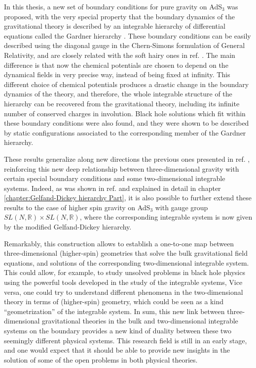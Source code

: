 \documentclass[letterpaper,11pt,oneside]{book}
\begin{document}
In this thesis, a new set of boundary conditions for pure gravity on AdS$_3$ was proposed, with the very special property that the boundary dynamics of the gravitational theory is described by an integrable hierarchy of differential equations called the Gardner hierarchy \cite{Ojeda:2019xih}. These boundary conditions can be easily described using the diagonal gauge in the Chern-Simons formulation of General Relativity, and are closely related with the soft hairy ones in ref. \cite{Afshar:2016wfy}. The main difference is that now the chemical potentials are chosen to depend on the dynamical fields in very precise way, instead of being fixed at infinity. This different choice of chemical potentials produces a  drastic change in the boundary dynamics of the theory, and therefore, the whole integrable structure of the hierarchy can be recovered from the gravitational theory, including its infinite number of conserved charges in involution. Black hole solutions which fit within these boundary conditions were also found, and they were shown to be described by static configurations associated to the corresponding member of the Gardner hierarchy.

These results generalize along new directions the previous ones presented in ref. \cite{Perez:2016vqo}, reinforcing this new deep relationship between three-dimensional gravity with certain special boundary conditions and some two-dimensional integrable systems. Indeed, as was shown in ref. \cite{Ojeda:2020bgz} and explained in detail in chapter \ref{chapter:Gelfand-Dickey hierarchy Part}, it is also possible to further extend these results to the case of higher spin gravity on AdS$_3$ with gauge group $SL\left(N,\mathbb{R}\right)\times SL\left(N,\mathbb{R}\right)$, where the corresponding integrable system is now given by the modified Gelfand-Dickey hierarchy.

\newpage

Remarkably, this construction allows to establish a one-to-one map between three-dimensional (higher-spin) geometries that solve the bulk gravitational field equations, and solutions of the corresponding two-dimensional integrable system. This could allow, for example, to study unsolved problems in black hole physics using the powerful tools developed in the study of the integrable systems, Vice versa, one could try to understand different phenomena in the two-dimensional theory in terms of (higher-spin) geometry, which could be seen as a kind ``geometrization''  of the integrable system. In sum, this new link between three-dimensional gravitational theories in the bulk and two-dimensional integrable systems on the boundary provides a new kind of duality between these two seemingly different physical systems. This research field is still in an early stage, and one would expect that it should be able to provide new insights in the solution of some of the open problems in both physical theories.
\end{document}

